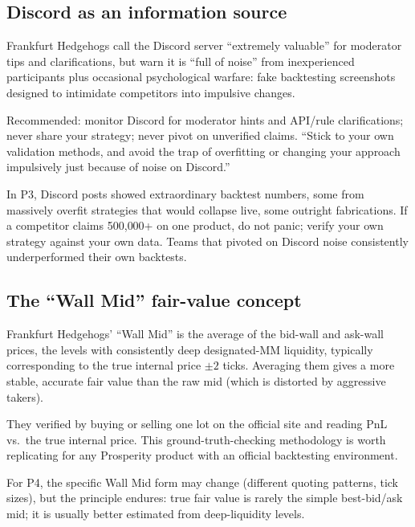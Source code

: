 \subsection{Discord as an information source}

Frankfurt Hedgehogs call the Discord server ``extremely valuable''
for moderator tips and clarifications, but warn it is ``full of
noise'' from inexperienced participants plus occasional
psychological warfare: fake backtesting screenshots designed to
intimidate competitors into impulsive changes.

Recommended: monitor Discord for moderator hints and API/rule
clarifications; never share your strategy; never pivot on
unverified claims.  ``Stick to your own validation methods, and
avoid the trap of overfitting or changing your approach
impulsively just because of noise on Discord.''

\begin{pitfallbox}
In P3, Discord posts showed extraordinary backtest numbers, some
from massively overfit strategies that would collapse live, some
outright fabrications.  If a competitor claims 500{,}000+ on one
product, do not panic; verify your own strategy against your own
data.  Teams that pivoted on Discord noise consistently
underperformed their own backtests.
\end{pitfallbox}

\subsection{The ``Wall Mid'' fair-value concept}

Frankfurt Hedgehogs' ``Wall Mid'' is the average of the bid-wall
and ask-wall prices, the levels with consistently deep designated-MM
liquidity, typically corresponding to the true internal price
$\pm 2$ ticks.  Averaging them gives a more stable, accurate fair
value than the raw mid (which is distorted by aggressive takers).

They verified by buying or selling one lot on the official site
and reading PnL vs.\ the true internal price.  This
ground-truth-checking methodology is worth replicating for any
Prosperity product with an official backtesting environment.

For P4, the specific Wall Mid form may change (different quoting
patterns, tick sizes), but the principle endures: true fair value
is rarely the simple best-bid/ask mid; it is usually better
estimated from deep-liquidity levels.

